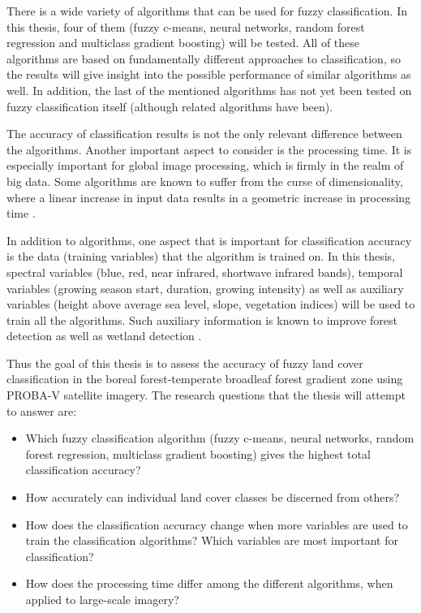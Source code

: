 \documentclass[a4paper,10pt]{article}
\begin{document}
There is a wide variety of algorithms that can be used for fuzzy classification. In this thesis, four of them (fuzzy c-means, neural networks, random forest regression and multiclass gradient boosting) will be tested. All of these algorithms are based on fundamentally different approaches to classification, so the results will give insight into the possible performance of similar algorithms as well. In addition, the last of the mentioned algorithms has not yet been tested on fuzzy classification itself (although related algorithms have been).

The accuracy of classification results is not the only relevant difference between the algorithms. Another important aspect to consider is the processing time. It is especially important for global image processing, which is firmly in the realm of big data. Some algorithms are known to suffer from the curse of dimensionality, where a linear increase in input data results in a geometric increase in processing time \cite{walton2008subpixelrf}.

In addition to algorithms, one aspect that is important for classification accuracy is the data (training variables) that the algorithm is trained on. In this thesis, spectral variables (blue, red, near infrared, shortwave infrared bands), temporal variables (growing season start, duration, growing intensity) as well as auxiliary variables (height above average sea level, slope, vegetation indices) will be used to train all the algorithms. Such auxiliary information is known to improve forest detection as well as wetland detection \cite{sader1995wetlands}.

Thus the goal of this thesis is to assess the accuracy of fuzzy land cover classification in the boreal forest-temperate broadleaf forest gradient zone using PROBA-V satellite imagery. The research questions that the thesis will attempt to answer are:

\begin{itemize}
 \item Which fuzzy classification algorithm (fuzzy c-means, neural networks, random forest regression, multiclass gradient boosting) gives the highest total classification accuracy?
 \item How accurately can individual land cover classes be discerned from others?
 \item How does the classification accuracy change when more variables are used to train the classification algorithms? Which variables are most important for classification?
 \item How does the processing time differ among the different algorithms, when applied to large-scale imagery?
\end{itemize}
\end{document}
